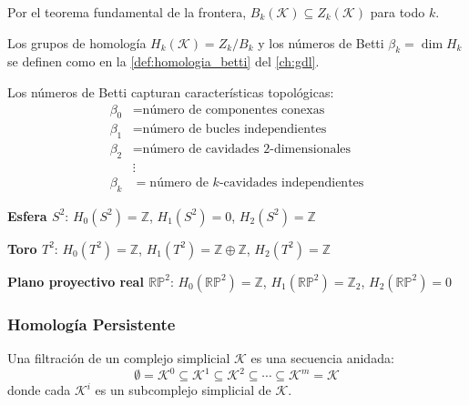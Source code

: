 Por el teorema fundamental de la frontera, $B_k(\mathcal{K}) \subseteq Z_k(\mathcal{K})$ para todo $k$.

Los grupos de homología $H_k(\mathcal{K}) = Z_k/B_k$ y los números de Betti $\beta_k = \dim H_k$ se definen como en la \autoref{def:homologia_betti} del \autoref{ch:gdl}.\label{def:grupos_homologia}\label{def:numeros_betti}

\begin{remark}\label{rem:interpretacion_betti}
Los números de Betti capturan características topológicas:
\begin{align}
    \beta_0 &= \text{número de componentes conexas} \\
    \beta_1 &= \text{número de bucles independientes} \\
    \beta_2 &= \text{número de cavidades 2-dimensionales} \\
    &\vdots \\
    \beta_k &= \text{número de } k\text{-cavidades independientes}
\end{align}
\end{remark}

\begin{example}\label{ex:homologia_basicas}
\textbf{Esfera $S^2$}: $H_0(S^2) = \mathbb{Z}$, $H_1(S^2) = 0$, $H_2(S^2) = \mathbb{Z}$

\textbf{Toro $T^2$}: $H_0(T^2) = \mathbb{Z}$, $H_1(T^2) = \mathbb{Z} \oplus \mathbb{Z}$, $H_2(T^2) = \mathbb{Z}$

\textbf{Plano proyectivo real $\mathbb{RP}^2$}: $H_0(\mathbb{RP}^2) = \mathbb{Z}$, $H_1(\mathbb{RP}^2) = \mathbb{Z}_2$, $H_2(\mathbb{RP}^2) = 0$
\end{example}

\subsubsection{Homología Persistente}

\begin{definition}[Filtración]\label{def:filtracion}
Una filtración de un complejo simplicial $\mathcal{K}$ es una secuencia anidada:
\begin{equation}
    \emptyset = \mathcal{K}^0 \subseteq \mathcal{K}^1 \subseteq \mathcal{K}^2 \subseteq \cdots \subseteq \mathcal{K}^m = \mathcal{K}
\end{equation}
donde cada $\mathcal{K}^i$ es un subcomplejo simplicial de $\mathcal{K}$.
\end{definition}

